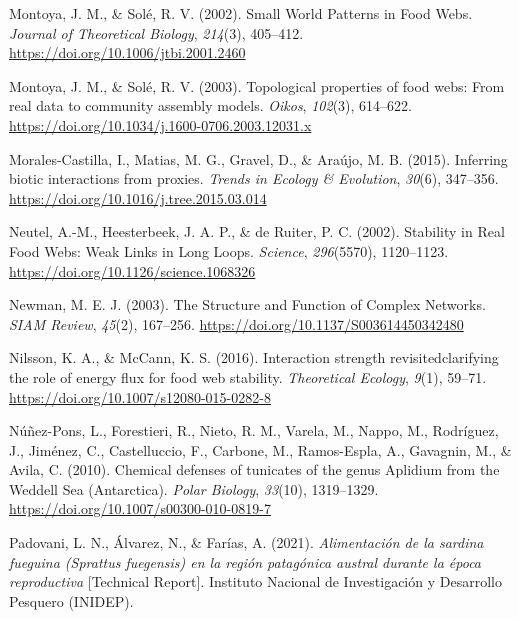 \documentclass[preprint, 3p,
authoryear]{elsarticle} %
\newlength{\cslhangindent}
\newlength{\cslentryspacingunit} %
\newenvironment{CSLReferences}[2] %
 {%
  \setlength{\parindent}{0pt}
  \ifodd #1
  \let\oldpar\par
  \def\par{\hangindent=\cslhangindent\oldpar}
  \fi
  \setlength{\parskip}{#2\cslentryspacingunit}
 }%
 {}
\begin{document}
\begin{CSLReferences}{1}{0}
\leavevmode{}%
Montoya, J. M., \& Solé, R. V. (2002). Small {World Patterns} in {Food
Webs}. \emph{Journal of Theoretical Biology}, \emph{214}(3), 405--412.
\url{https://doi.org/10.1006/jtbi.2001.2460}

\leavevmode{}%
Montoya, J. M., \& Solé, R. V. (2003). Topological properties of food
webs: From real data to community assembly models. \emph{Oikos},
\emph{102}(3), 614--622.
\url{https://doi.org/10.1034/j.1600-0706.2003.12031.x}

\leavevmode{}%
Morales-Castilla, I., Matias, M. G., Gravel, D., \& Araújo, M. B.
(2015). Inferring biotic interactions from proxies. \emph{Trends in
Ecology \& Evolution}, \emph{30}(6), 347--356.
\url{https://doi.org/10.1016/j.tree.2015.03.014}

\leavevmode{}%
Neutel, A.-M., Heesterbeek, J. A. P., \& de Ruiter, P. C. (2002).
Stability in {Real Food Webs}: {Weak Links} in {Long Loops}.
\emph{Science}, \emph{296}(5570), 1120--1123.
\url{https://doi.org/10.1126/science.1068326}

\leavevmode{}%
Newman, M. E. J. (2003). The {Structure} and {Function} of {Complex
Networks}. \emph{SIAM Review}, \emph{45}(2), 167--256.
\url{https://doi.org/10.1137/S003614450342480}

\leavevmode{}%
Nilsson, K. A., \& McCann, K. S. (2016). Interaction strength
revisited\textemdash clarifying the role of energy flux for food web
stability. \emph{Theoretical Ecology}, \emph{9}(1), 59--71.
\url{https://doi.org/10.1007/s12080-015-0282-8}

\leavevmode{}%
Núñez-Pons, L., Forestieri, R., Nieto, R. M., Varela, M., Nappo, M.,
Rodríguez, J., Jiménez, C., Castelluccio, F., Carbone, M., Ramos-Espla,
A., Gavagnin, M., \& Avila, C. (2010). Chemical defenses of tunicates of
the genus {Aplidium} from the {Weddell Sea} ({Antarctica}). \emph{Polar
Biology}, \emph{33}(10), 1319--1329.
\url{https://doi.org/10.1007/s00300-010-0819-7}

\leavevmode{}%
Padovani, L. N., Álvarez, N., \& Farías, A. (2021). \emph{Alimentación
de la sardina fueguina ({Sprattus} fuegensis) en la región patagónica
austral durante la época reproductiva} {[}Technical Report{]}.
{Instituto Nacional de Investigación y Desarrollo Pesquero (INIDEP)}.


\end{CSLReferences}
\end{document}
